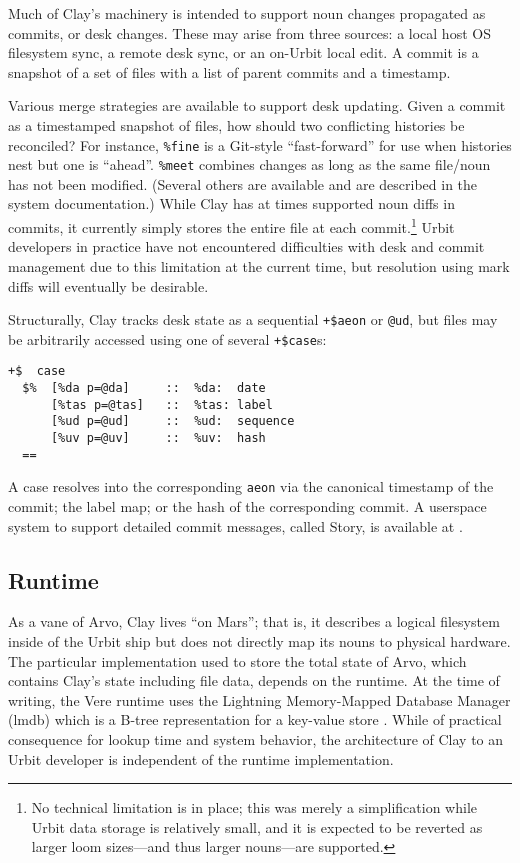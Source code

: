 \documentclass[twoside]{article}
\begin{document}
Much of Clay's machinery is intended to support noun changes propagated as commits, or desk changes.  These may arise from three sources:  a local host OS filesystem sync, a remote desk sync, or an on-Urbit local edit.  A commit is a snapshot of a set of files with a list of parent commits and a timestamp.

Various merge strategies are available to support desk updating.  Given a commit as a timestamped snapshot of files, how should two conflicting histories be reconciled?  For instance, \lstinline[style=inlinecode]{%fine} is a Git-style ``fast-forward'' for use when histories nest but one is ``ahead''.  \lstinline[style=inlinecode]{%meet} combines changes as long as the same file/noun has not been modified.  (Several others are available and are described in the system documentation.)  While Clay has at times supported noun diffs in commits, it currently simply stores the entire file at each commit.\footnote{No technical limitation is in place; this was merely a simplification while Urbit data storage is relatively small, and it is expected to be reverted as larger loom sizes—and thus larger nouns—are supported.}  Urbit developers in practice have not encountered difficulties with desk and commit management due to this limitation at the current time, but resolution using mark diffs will eventually be desirable.

Structurally, Clay tracks desk state as a sequential \lstinline[style=inlinecode]{+$aeon} or \lstinline[style=inlinecode]{@ud}, but files may be arbitrarily accessed using one of several \lstinline[style=inlinecode]{+$case}s:

\begin{lstlisting}[style=listingcode]
+$  case
  $%  [%da p=@da]     ::  %da:  date
      [%tas p=@tas]   ::  %tas: label
      [%ud p=@ud]     ::  %ud:  sequence
      [%uv p=@uv]     ::  %uv:  hash
  ==
\end{lstlisting}

\noindent
A case resolves into the corresponding \lstinline[style=inlinecode]{aeon} via the canonical timestamp of the commit; the label map; or the hash of the corresponding commit.  A userspace system to support detailed commit messages, called Story, is available at .

\subsection{Runtime}

As a vane of Arvo, Clay lives ``on Mars''; that is, it describes a logical filesystem inside of the Urbit ship but does not directly map its nouns to physical hardware.  The particular implementation used to store the total state of Arvo, which contains Clay's state including file data, depends on the runtime.  At the time of writing, the Vere runtime uses the Lightning Memory-Mapped Database Manager ({\sc lmdb}) which is a B-tree representation for a key-value store \citep{LMDB}.  While of practical consequence for lookup time and system behavior, the architecture of Clay to an Urbit developer is independent of the runtime implementation.
\end{document}

